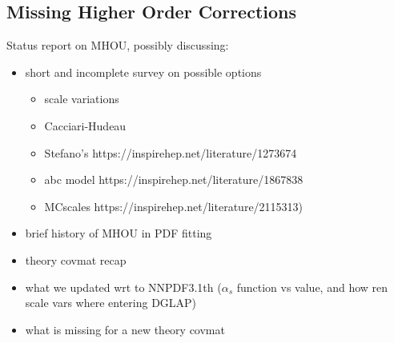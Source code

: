 \subsection{Missing Higher Order Corrections}
\label{sec:pine/mhou}

Status report on MHOU, possibly discussing:
\begin{itemize}
	\item short and incomplete survey on possible options
	\begin{itemize}
		\item scale variations
		\item Cacciari-Hudeau
		\item  Stefano's https://inspirehep.net/literature/1273674
		\item abc model https://inspirehep.net/literature/1867838
		\item MCscales https://inspirehep.net/literature/2115313)
	\end{itemize} 
	\item brief history of MHOU in PDF fitting
	\item theory covmat recap
	\item what we updated wrt to NNPDF3.1th ($\alpha_s$ function vs value, and
		how ren scale vars where entering DGLAP)
	\item what is missing for a new theory covmat
\end{itemize}


